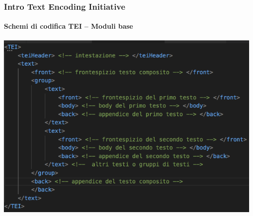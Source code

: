 \begin{frame}
	\frametitle{Intro Text Encoding Initiative}
	\framesubtitle{Schemi di codifica TEI – Moduli base}
	\addtocounter{nframe}{1}

	\begin{center}
		\includegraphics[width=.95\textwidth]{imgs/composito1.png}
	\end{center}


\end{frame}

